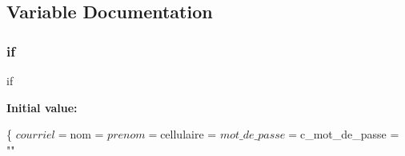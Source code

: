 \subsection{Variable Documentation}
\mbox{\label{upload_8php_ab0937f5c55c93af3d8d8e5e2219eb0af}} 
\subsubsection{\texorpdfstring{if}{if}}
{\footnotesize\ttfamily if}

{\bfseries Initial value\+:}
\begin{DoxyCode}
\{
            $courriel = $nom = $prenom = $cellulaire = $mot\_de\_passe = $c\_mot\_de\_passe = \textcolor{stringliteral}{""}
\end{DoxyCode}
